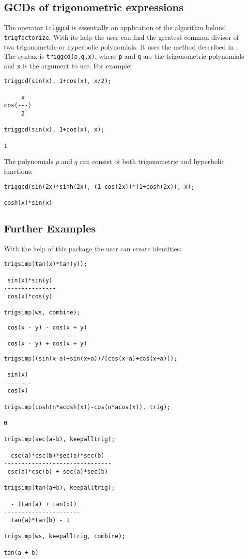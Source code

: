 \subsection{GCDs of trigonometric expressions}

The operator \texttt{triggcd} is essentially an application of the
algorithm behind \texttt{trigfactorize}.  With its help the user can
find the greatest common divisor of two trigonometric or hyperbolic
polynomials.  It uses the method described in \cite{art}.  The syntax
is \texttt{triggcd(p,q,x)}, where \texttt{p} and \texttt{q} are the
trigonometric polynomials and \texttt{x} is the argument to use.  For
example:
\begin{verbatim}
triggcd(sin(x), 1+cos(x), x/2);

     x
cos(---)
     2

triggcd(sin(x), 1+cos(x), x);

1
\end{verbatim}
The polynomials $p$ and $q$ can consist of both trigonometric and
hyperbolic functions:
\begin{verbatim}
triggcd(sin(2x)*sinh(2x), (1-cos(2x))*(1+cosh(2x)), x);

cosh(x)*sin(x)
\end{verbatim}


\subsection{Further Examples}

With the help of this package the user can create identities:
\begin{verbatim}
trigsimp(tan(x)*tan(y));

 sin(x)*sin(y)
---------------
 cos(x)*cos(y)

trigsimp(ws, combine);
\end{verbatim}

{\samepage
\begin{verbatim}
 cos(x - y) - cos(x + y)
-------------------------
 cos(x - y) + cos(x + y)
\end{verbatim}}

\begin{verbatim}
trigsimp((sin(x-a)+sin(x+a))/(cos(x-a)+cos(x+a)));

 sin(x)
--------
 cos(x)

trigsimp(cosh(n*acosh(x))-cos(n*acos(x)), trig);

0

trigsimp(sec(a-b), keepalltrig);

  csc(a)*csc(b)*sec(a)*sec(b)
-------------------------------
 csc(a)*csc(b) + sec(a)*sec(b)

trigsimp(tan(a+b), keepalltrig);

  - (tan(a) + tan(b))
----------------------
  tan(a)*tan(b) - 1

trigsimp(ws, keepalltrig, combine);

tan(a + b)
\end{verbatim}

